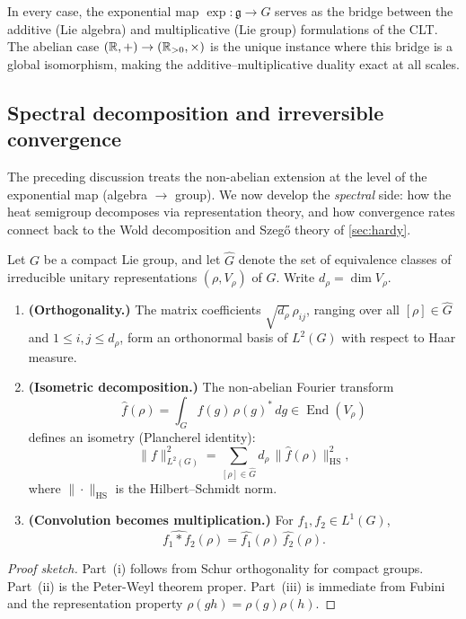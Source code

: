 \noindent In every case, the exponential map $\exp : \mathfrak{g} \to G$ serves as the bridge between the additive (Lie algebra) and multiplicative (Lie group) formulations of the CLT. The abelian case $(\mathbb{R}, +) \to (\mathbb{R}_{>0}, \times)$ is the unique instance where this bridge is a global isomorphism, making the additive--multiplicative duality exact at all scales.

\subsection*{Spectral decomposition and irreversible convergence}

The preceding discussion treats the non-abelian extension at the level of the exponential map (algebra $\to$ group). We now develop the \emph{spectral} side: how the heat semigroup decomposes via representation theory, and how convergence rates connect back to the Wold decomposition and Szeg\H{o} theory of \cref{sec:hardy}.

\begin{theorem}\label{thm:peter-weyl}
Let $G$ be a compact Lie group, and let $\widehat{G}$ denote the set of equivalence classes of irreducible unitary representations $(\rho, V_\rho)$ of $G$. Write $d_\rho = \dim V_\rho$.
\begin{enumerate}[label=(\roman*)]
\item \textbf{(Orthogonality.)} The matrix coefficients $\sqrt{d_\rho}\, \rho_{ij}$, ranging over all $[\rho] \in \widehat{G}$ and $1 \leq i, j \leq d_\rho$, form an orthonormal basis of $L^2(G)$ with respect to Haar measure.

\item \textbf{(Isometric decomposition.)} The non-abelian Fourier transform
\[
\widehat{f}(\rho) = \int_G f(g)\, \rho(g)^*\, dg \in \operatorname{End}(V_\rho)
\]
defines an isometry (Plancherel identity):
\[
\|f\|_{L^2(G)}^2 = \sum_{[\rho] \in \widehat{G}} d_\rho\, \|\widehat{f}(\rho)\|_{\mathrm{HS}}^2,
\]
where $\|\cdot\|_{\mathrm{HS}}$ is the Hilbert--Schmidt norm.

\item \textbf{(Convolution becomes multiplication.)} For $f_1, f_2 \in L^1(G)$,
\[
\widehat{f_1 * f_2}(\rho) = \widehat{f_1}(\rho)\, \widehat{f_2}(\rho).
\]
\end{enumerate}
\end{theorem}

\begin{proof}[Proof sketch]
Part~(i) follows from Schur orthogonality for compact groups. Part~(ii) is the Peter-Weyl theorem proper. Part~(iii) is immediate from Fubini and the representation property $\rho(gh) = \rho(g)\rho(h)$.
\end{proof}

